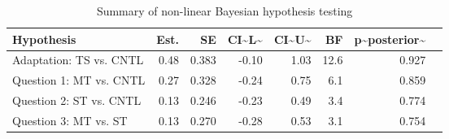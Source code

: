 \begin{table}

\caption{\label{tab:unnamed-chunk-29}Summary of non-linear Bayesian hypothesis testing}
\centering
\begin{tabular}[t]{l|r|r|r|r|r|r|l}
\hline
Hypothesis & Est. & SE & CI\textasciitilde{}L\textasciitilde{} & CI\textasciitilde{}U\textasciitilde{} & BF & p\textasciitilde{}posterior\textasciitilde{} & \\
\hline
Adaptation: TS vs. CNTL & 0.48 & 0.383 & -0.10 & 1.03 & 12.6 & 0.927 & \\
\hline
Question 1: MT vs. CNTL & 0.27 & 0.328 & -0.24 & 0.75 & 6.1 & 0.859 & \\
\hline
Question 2: ST vs. CNTL & 0.13 & 0.246 & -0.23 & 0.49 & 3.4 & 0.774 & \\
\hline
Question 3: MT vs. ST & 0.13 & 0.270 & -0.28 & 0.53 & 3.1 & 0.754 & \\
\hline
\end{tabular}
\end{table}
